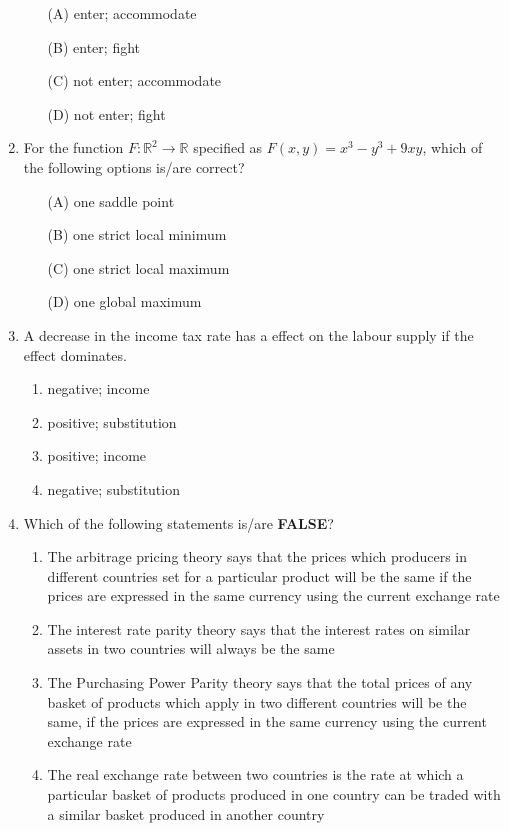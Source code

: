 \documentclass[journal,12pt,onecolumn]{exam}
\theoremstyle{remark}
\begin{document}
\begin{enumerate}
\begin{enumerate}
    \item[(A)] enter; accommodate
    \item[(B)] enter; fight
    \item[(C)] not enter; accommodate
    \item[(D)] not enter; fight
\end{enumerate}



\item For the function \( F: \mathbb{R}^2 \to \mathbb{R} \) specified as \( F(x,y) = x^3 - y^3 + 9xy \), which of the following options is/are correct?

\begin{enumerate}
    \item[(A)] one saddle point
    \item[(B)] one strict local minimum
    \item[(C)] one strict local maximum
    \item[(D)] one global maximum
\end{enumerate}

\item A decrease in the income tax rate has a \underline{\hspace{2cm}} effect on the labour supply if the \underline{\hspace{2cm}} effect dominates.

  \begin{enumerate}
    \item negative; income
    \item positive; substitution
    \item positive; income
    \item negative; substitution
  \end{enumerate}

  \item Which of the following statements is/are \textbf{FALSE}?

  \begin{enumerate}
    \item The arbitrage pricing theory says that the prices which producers in different countries set for a particular product will be the same if the prices are expressed in the same currency using the current exchange rate
    \item The interest rate parity theory says that the interest rates on similar assets in two countries will always be the same
    \item The Purchasing Power Parity theory says that the total prices of any basket of products which apply in two different countries will be the same, if the prices are expressed in the same currency using the current exchange rate
    \item The real exchange rate between two countries is the rate at which a particular basket of products produced in one country can be traded with a similar basket produced in another country
  \end{enumerate}


\end{enumerate}
\end{document}
